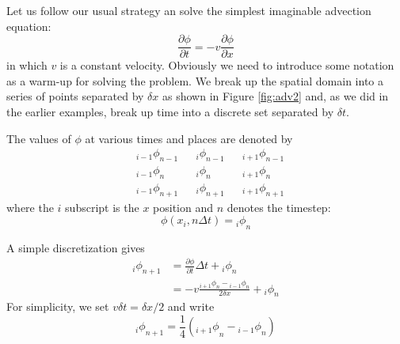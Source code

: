 \documentclass[10pt]{article}
\begin{document}
	Let us follow our usual strategy an solve the simplest imaginable advection equation:
		\begin{equation}
			\frac{\partial \phi}{\partial t} = -v \frac{\partial \phi}{\partial x}
		\end{equation}
	in which $v$ is a constant velocity. Obviously we need to introduce some
	notation as a warm-up for solving the problem. We break up the
	spatial domain into a series of points separated by $\delta x$ as 
	shown in Figure \ref{fig:adv2} and, as we did in the earlier examples,
	break up time into a discrete set separated by $\delta t$.
	
	The values of $\phi$ at various times and places are denoted by
		\begin{align}
			&&	&_{i-1}\phi_{n-1}	&&_{i}\phi_{n-1} 	&& _{i+1}\phi_{n-1} && \nonumber \\
			&&	&_{i-1}\phi_{n} 		&&_{i}\phi_{n} 		&& _{i+1}\phi_{n}  &&\\
			&&	&_{i-1}\phi_{n+1}	&&_{i}\phi_{n+1} 	&& _{i+1}\phi_{n+1} &&\nonumber 
		\end{align}
	where the $i$ subscript is the $x$ position and $n$ denotes the timestep:
		\begin{equation}
			\phi(x_i,n\Delta t) = {_{i}\phi}_n
		\end{equation}
	
	A simple discretization gives
		\begin{equation}
			\begin{split}
			_{i}\phi_{n+1} &= \frac{\partial \phi}{\partial t} \Delta t + {_{i}\phi_n} \\
						& = -v \frac{{_{i+1}\phi_n} - {_{i-1}\phi_n}}{2 \delta x} + {_{i}\phi_n}
			\end{split}
		\end{equation}
	For simplicity, we set $v\delta t = \delta x /2$ and write
		\begin{equation}
			{_{i}\phi}_{n+1} = \frac{1}{4}\left(  {_{i+1}\phi}_n - {_{i-1}\phi}_n \right)
		\end{equation}
		
\end{document}
